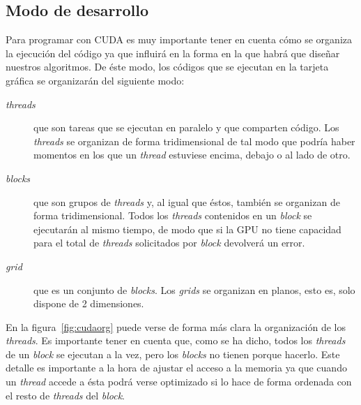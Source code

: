 \subsection{Modo de desarrollo}

Para programar con CUDA es muy importante tener en cuenta cómo se organiza la ejecución del código ya que influirá en la forma en la que habrá que diseñar nuestros algoritmos. De éste modo, los códigos que se ejecutan en la tarjeta gráfica se organizarán del siguiente modo:

\begin{description}
	\item[\emph{threads}] que son tareas que se ejecutan en paralelo y que comparten código. Los \emph{threads} se organizan de forma tridimensional de tal modo que podría haber momentos en los que un \emph{thread} estuviese encima, debajo o al lado de otro.

	\item[\emph{blocks}] que son grupos de \emph{threads} y, al igual que éstos, también se organizan de forma tridimensional. Todos los \emph{threads} contenidos en un \emph{block} se ejecutarán al mismo tiempo, de modo que si la GPU no tiene capacidad para el total de \emph{threads} solicitados por \emph{block} devolverá un error.

	\item[\emph{grid}] que es un conjunto de \emph{blocks}. Los \emph{grids} se organizan en planos, esto es, solo dispone de 2 dimensiones.
\end{description}

En la figura~\ref{fig:cudaorg} puede verse de forma más clara la organización de los \emph{threads}. Es importante tener en cuenta que, como se ha dicho, todos los \emph{threads} de un \emph{block} se ejecutan a la vez, pero los \emph{blocks} no tienen porque hacerlo. Este detalle es importante a la hora de ajustar el acceso a la memoria ya que cuando un \emph{thread} accede a ésta podrá verse optimizado si lo hace de forma ordenada con el resto de \emph{threads} del \emph{block}.

